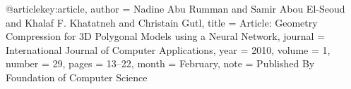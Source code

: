 @article{key:article,
	author = {Nadine Abu Rumman and Samir Abou El-Seoud and Khalaf F. Khatatneh and Christain Gutl},
	title = {Article: Geometry Compression for 3D Polygonal Models using a Neural Network},
	journal = {International Journal of Computer Applications},
	year = {2010},
	volume = {1},
	number = {29},
	pages = {13--22},
	month = {February},
	note = {Published By Foundation of Computer Science}
}